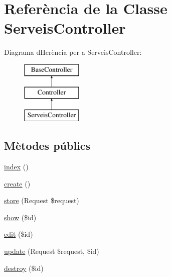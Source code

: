 \hypertarget{class_app_1_1_http_1_1_controllers_1_1_serveis_controller}{}\section{Referència de la Classe Serveis\+Controller}
\label{class_app_1_1_http_1_1_controllers_1_1_serveis_controller}
Diagrama d\textquotesingle{}Herència per a Serveis\+Controller\+:\begin{figure}[H]
\begin{center}
\leavevmode
\includegraphics[height=3.000000cm]{class_app_1_1_http_1_1_controllers_1_1_serveis_controller}
\end{center}
\end{figure}
\subsection*{Mètodes públics}
\begin{DoxyCompactItemize}
\item 
\mbox{\hyperlink{class_app_1_1_http_1_1_controllers_1_1_serveis_controller_a149eb92716c1084a935e04a8d95f7347}{index}} ()
\item 
\mbox{\hyperlink{class_app_1_1_http_1_1_controllers_1_1_serveis_controller_a435e7d7525d4bcd0ed5e34a469f3adf6}{create}} ()
\item 
\mbox{\hyperlink{class_app_1_1_http_1_1_controllers_1_1_serveis_controller_a9ef485163104597c12185b53cdacf638}{store}} (Request \$request)
\item 
\mbox{\hyperlink{class_app_1_1_http_1_1_controllers_1_1_serveis_controller_ae4914d07a9bbe4aede7a5dea759f6287}{show}} (\$id)
\item 
\mbox{\hyperlink{class_app_1_1_http_1_1_controllers_1_1_serveis_controller_a459ed16587e3a50b39b672c7e473abc5}{edit}} (\$id)
\item 
\mbox{\hyperlink{class_app_1_1_http_1_1_controllers_1_1_serveis_controller_affb03cc19897a1800a0f411264d6c7cc}{update}} (Request \$request, \$id)
\item 
\mbox{\hyperlink{class_app_1_1_http_1_1_controllers_1_1_serveis_controller_a726fa8a4b4b187b9ca32ba427aac8137}{destroy}} (\$id)
\end{DoxyCompactItemize}


